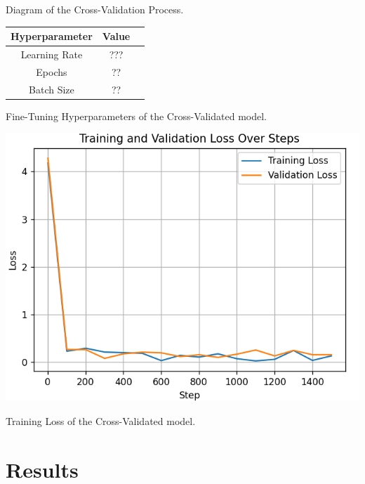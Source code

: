 \documentclass[10pt,twocolumn,letterpaper]{article}
\begin{document}
\begin{center}
    \small {Diagram of the Cross-Validation Process.} 
\end{center}

\begin{center}

    \begin{tabular}{ccc}
        \toprule
        Hyperparameter & Value \\
        \midrule
        Learning Rate & ??? \\
        Epochs & ?? \\
        Batch Size & ?? \\
        \bottomrule
    \end{tabular} 
 
\end{center}

\begin{center}
    \small {Fine-Tuning Hyperparameters of the Cross-Validated model.}
\end{center}

\begin{center}
\includegraphics*[scale=0.55]{img/training_loss_full.png}
\end{center} 

\begin{center}
    \small {Training Loss of the Cross-Validated model.} 
\end{center}

\section{Results}
\end{document}
